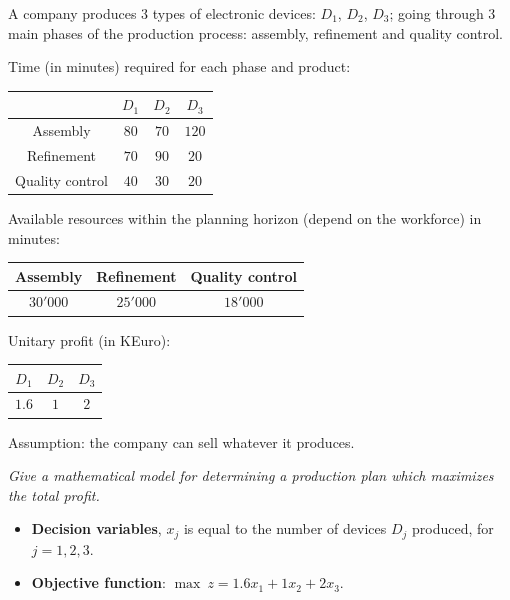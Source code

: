 \begin{examplebox}
    A company produces 3 types of electronic devices: $D_{1}$, $D_{2}$, $D_{3}$; going through 3 main phases of the production process: assembly, refinement and quality control.

    Time (in minutes) required for each phase and product:

    \begin{center}
        \begin{tabular}{@{} c | c c c @{}}
            & $D_{1}$ & $D_{2}$ & $D_{3}$ \\
            \midrule
            Assembly        & $80$ & $70$ & $120$ \\
            Refinement      & $70$ & $90$ & $20$ \\
            Quality control & $40$ & $30$ & $20$
        \end{tabular}
    \end{center}

    Available resources within the planning horizon (depend on the workforce) in minutes:
    \begin{center}
        \begin{tabular}{@{} c | c | c @{}}
            Assembly & Refinement & Quality control \\
            \midrule
            $30'000$ & $25'000$ & $18'000$
        \end{tabular}
    \end{center}

    Unitary profit (in KEuro):
    \begin{center}
        \begin{tabular}{@{} c | c | c @{}}
            $D_{1}$ & $D_{2}$ & $D_{3}$ \\
            \midrule
            $1.6$ & $1$ & $2$
        \end{tabular}
    \end{center}
    
    Assumption: the company can sell whatever it produces.

    \emph{Give a mathematical model for determining a production plan which maximizes the total profit.}

    \begin{itemize}
        \item \textbf{Decision variables}, $x_{j}$ is equal to the number of devices $D_{j}$ produced, for $j = 1, 2, 3$.
        
        \item \textbf{Objective function}: $\max \: z = 1.6x_{1} + 1x_{2} + 2x_{3}$.


\end{itemize}
\end{examplebox}
